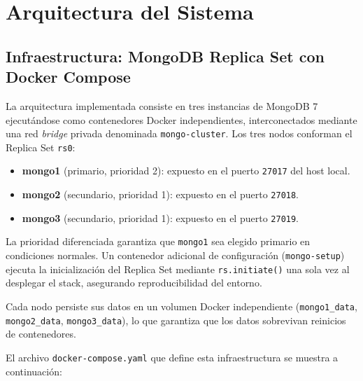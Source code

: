 \documentclass[12pt,a4paper]{article}
\begin{document}
\section{Arquitectura del Sistema}

\subsection{Infraestructura: MongoDB Replica Set con Docker Compose}

La arquitectura implementada consiste en tres instancias de MongoDB 7 ejecutándose como contenedores Docker independientes, interconectados mediante una red \textit{bridge} privada denominada \texttt{mongo-cluster}. Los tres nodos conforman el Replica Set \texttt{rs0}:

\begin{itemize}
    \item \textbf{mongo1} (primario, prioridad 2): expuesto en el puerto \texttt{27017} del host local.
    \item \textbf{mongo2} (secundario, prioridad 1): expuesto en el puerto \texttt{27018}.
    \item \textbf{mongo3} (secundario, prioridad 1): expuesto en el puerto \texttt{27019}.
\end{itemize}

La prioridad diferenciada garantiza que \texttt{mongo1} sea elegido primario en condiciones normales. Un contenedor adicional de configuración (\texttt{mongo-setup}) ejecuta la inicialización del Replica Set mediante \texttt{rs.initiate()} una sola vez al desplegar el stack, asegurando reproducibilidad del entorno.

Cada nodo persiste sus datos en un volumen Docker independiente (\texttt{mongo1\_data}, \texttt{mongo2\_data}, \texttt{mongo3\_data}), lo que garantiza que los datos sobrevivan reinicios de contenedores.

El archivo \texttt{docker-compose.yaml} que define esta infraestructura se muestra a continuación:
\end{document}
